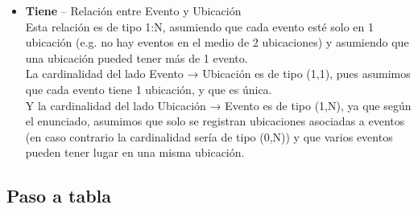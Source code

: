 \documentclass[12pt]{article}
\begin{document}
\begin{itemize}
        \item \textbf{Tiene} -- Relación entre Evento y Ubicación\\
            Esta relación es de tipo 1:N, asumiendo que cada evento esté solo en 1 ubicación (e.g. no hay eventos en el medio de 2 ubicaciones)
            y asumiendo que una ubicación pueded tener más de 1 evento. \\
            La cardinalidad del lado Evento → Ubicación es de tipo (1,1), pues asumimos que cada evento tiene 1 ubicación, y que es única. \\
            Y la cardinalidad del lado Ubicación → Evento es de tipo (1,N), ya que según el enunciado, asumimos que solo se registran ubicaciones asociadas 
            a eventos (en caso contrario la cardinalidad sería de tipo (0,N)) y que varios eventos pueden tener lugar en una misma ubicación.

    \end{itemize}

    \newpage
    \subsection{Paso a tabla}
\end{document}
